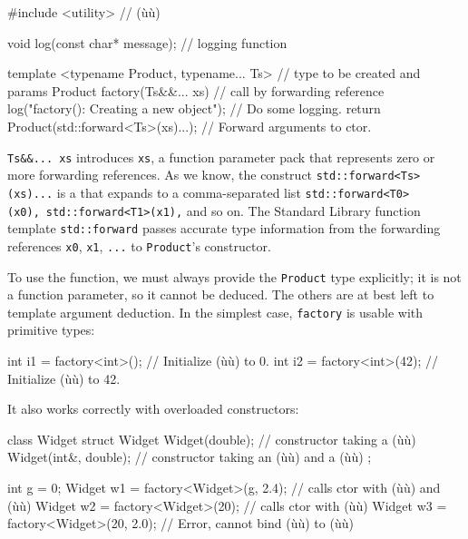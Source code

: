 \begin{emcppslisting}
#include <utility>                            // (ù{}ù)

void log(const char* message);                // logging function

template <typename Product, typename... Ts>   // type to be created and params
Product factory(Ts&&... xs)                   // call by forwarding reference
{
    log("factory(): Creating a new object");  // Do some logging.
    return Product(std::forward<Ts>(xs)...);  // Forward arguments to ctor.
}
\end{emcppslisting}
    

\noindent \lstinline!Ts&&...!~\lstinline!xs! introduces \lstinline!xs!, a function
parameter pack that represents zero or more forwarding references. As we
know, the construct \lstinline!std::forward<Ts>(xs)...! is a  that expands to a comma-separated list
\lstinline!std::forward<T0>(x0),!~\lstinline!std::forward<T1>(x1),! and so on.
The Standard Library function template \lstinline!std::forward! passes
accurate type information from the forwarding references \lstinline!x0!,
\lstinline!x1!, \lstinline!...! to \lstinline!Product!'s constructor.

To use the function, we must always provide the \lstinline!Product! type
explicitly; it is not a function parameter, so it cannot be deduced. The
others are at best left to template argument deduction. In the simplest
case, \lstinline!factory! is usable with primitive types:

\begin{emcppslisting}
int i1 = factory<int>();               // Initialize (ù{}ù) to 0.
int i2 = factory<int>(42);             // Initialize (ù{}ù) to 42.
\end{emcppslisting}
    

\noindent It also works correctly with overloaded constructors:

\begin{emcppslisting}
class Widget
struct Widget
{
    Widget(double);        // constructor taking a (ù{}ù)
    Widget(int&, double);  // constructor taking an (ù{}ù) and a (ù{}ù)
};

int g = 0;
Widget w1 = factory<Widget>(g, 2.4);   // calls ctor with (ù{}ù) and (ù{}ù)
Widget w2 = factory<Widget>(20);       // calls ctor with (ù{}ù)
Widget w3 = factory<Widget>(20, 2.0);  // Error, cannot bind (ù{}ù) to (ù{}ù)
\end{emcppslisting}
    

